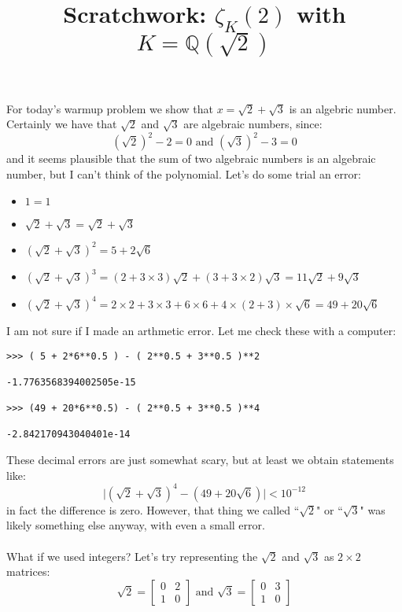 \documentclass[12pt]{article}
\title{Scratchwork: $\zeta_K(2)$ with $K = \mathbb{Q}(\sqrt{2})$}
\date{}
\begin{document}

\sffamily

\maketitle

\noindent For today's warmup problem we show that $x = \sqrt{2} + \sqrt{3}$ is an algebric number.  Certainly we have that $\sqrt{2}$ and $\sqrt{3}$ are algebraic numbers, since:
$$ (\sqrt{2})^2 - 2 = 0 \text{ and }(\sqrt{3})^2 - 3 = 0 $$
and it seems plausible that the sum of two algebraic numbers is an algebraic number, but I can't think of the polynomial.  Let's do some trial an error:
\begin{itemize}
\item $1 = 1$
\item $\sqrt{2}+ \sqrt{3} = \sqrt{2} + \sqrt{3}$
\item $(\sqrt{2}+\sqrt{3})^2 = 5 + 2 \sqrt{6}$
\item $(\sqrt{2}+\sqrt{3})^3 = (2+3 \times 3) \sqrt{2}+(3+3 \times 2)\sqrt{3} = 11 \sqrt{2} + 9 \sqrt{3}  $
\item $(\sqrt{2}+\sqrt{3})^4 = 2 \times 2 + 3 \times 3 + 6 \times 6 +  4 \times ( 2 + 3  ) \times  \sqrt{6}
 = 49 + 20 \sqrt{6} $
\end{itemize}
I am not sure if I made an arthmetic error.  Let me check these with a computer:
\begin{verbatim}
>>> ( 5 + 2*6**0.5 ) - ( 2**0.5 + 3**0.5 )**2 

-1.7763568394002505e-15

>>> (49 + 20*6**0.5) - ( 2**0.5 + 3**0.5 )**4 

-2.842170943040401e-14
\end{verbatim}
These decimal errors are just somewhat scary, but at least we obtain statements like:
$$ \big|(\sqrt{2}+\sqrt{3})^4 - ( 49 + 20 \sqrt{6}) \big| < 10^{-12}$$
in fact the difference is zero. However, that thing we called ``$\sqrt{2}$" or ``$\sqrt{3}$" was likely something else anyway, with even a small error. \\ \\
What if we used integers?  Let's try representing the $\sqrt{2}$ and $\sqrt{3}$ as $2 \times 2$ matrices:
$$ \sqrt{2} = \left[
\begin{array}{cc} 0 & 2 \\ 1 & 0\end{array} \right]
\text{ and }
\sqrt{3} = \left[
\begin{array}{cc} 0 & 3 \\ 1 & 0\end{array} \right]
$$
\end{document}
